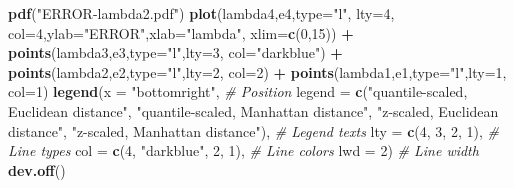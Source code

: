 \documentclass[12pt]{article}
\newenvironment{Shaded}{\begin{snugshade}}{\end{snugshade}}
\newcommand{\AttributeTok}[1]{\textcolor[rgb]{0.13,0.29,0.53}{#1}}
\newcommand{\CommentTok}[1]{\textcolor[rgb]{0.56,0.35,0.01}{\textit{#1}}}
\newcommand{\DecValTok}[1]{\textcolor[rgb]{0.00,0.00,0.81}{#1}}
\newcommand{\FunctionTok}[1]{\textcolor[rgb]{0.13,0.29,0.53}{\textbf{#1}}}
\newcommand{\NormalTok}[1]{#1}
\newcommand{\SpecialCharTok}[1]{\textcolor[rgb]{0.81,0.36,0.00}{\textbf{#1}}}
\newcommand{\StringTok}[1]{\textcolor[rgb]{0.31,0.60,0.02}{#1}}
\begin{document}
\begin{Shaded}
\begin{Highlighting}[]
\FunctionTok{pdf}\NormalTok{(}\StringTok{"ERROR{-}lambda2.pdf"}\NormalTok{)}
\FunctionTok{plot}\NormalTok{(lambda4,e4,}\AttributeTok{type=}\StringTok{"l"}\NormalTok{, }\AttributeTok{lty=}\DecValTok{4}\NormalTok{, }\AttributeTok{col=}\DecValTok{4}\NormalTok{,}\AttributeTok{ylab=}\StringTok{"ERROR"}\NormalTok{,}\AttributeTok{xlab=}\StringTok{"lambda"}\NormalTok{, }\AttributeTok{xlim=}\FunctionTok{c}\NormalTok{(}\DecValTok{0}\NormalTok{,}\DecValTok{15}\NormalTok{)) }\SpecialCharTok{+}
    \FunctionTok{points}\NormalTok{(lambda3,e3,}\AttributeTok{type=}\StringTok{"l"}\NormalTok{,}\AttributeTok{lty=}\DecValTok{3}\NormalTok{, }\AttributeTok{col=}\StringTok{"darkblue"}\NormalTok{) }\SpecialCharTok{+}
    \FunctionTok{points}\NormalTok{(lambda2,e2,}\AttributeTok{type=}\StringTok{"l"}\NormalTok{,}\AttributeTok{lty=}\DecValTok{2}\NormalTok{, }\AttributeTok{col=}\DecValTok{2}\NormalTok{) }\SpecialCharTok{+}
    \FunctionTok{points}\NormalTok{(lambda1,e1,}\AttributeTok{type=}\StringTok{"l"}\NormalTok{,}\AttributeTok{lty=}\DecValTok{1}\NormalTok{, }\AttributeTok{col=}\DecValTok{1}\NormalTok{)}
\FunctionTok{legend}\NormalTok{(}\AttributeTok{x =} \StringTok{"bottomright"}\NormalTok{,          }\CommentTok{\# Position}
       \AttributeTok{legend =} \FunctionTok{c}\NormalTok{(}\StringTok{"quantile{-}scaled, Euclidean distance"}\NormalTok{, }\StringTok{"quantile{-}scaled, Manhattan distance"}\NormalTok{, }\StringTok{"z{-}scaled, Euclidean distance"}\NormalTok{, }\StringTok{"z{-}scaled, Manhattan distance"}\NormalTok{),  }\CommentTok{\# Legend texts}
       \AttributeTok{lty =} \FunctionTok{c}\NormalTok{(}\DecValTok{4}\NormalTok{, }\DecValTok{3}\NormalTok{, }\DecValTok{2}\NormalTok{, }\DecValTok{1}\NormalTok{),           }\CommentTok{\# Line types}
       \AttributeTok{col =} \FunctionTok{c}\NormalTok{(}\DecValTok{4}\NormalTok{, }\StringTok{"darkblue"}\NormalTok{, }\DecValTok{2}\NormalTok{, }\DecValTok{1}\NormalTok{),           }\CommentTok{\# Line colors}
       \AttributeTok{lwd =} \DecValTok{2}\NormalTok{)                 }\CommentTok{\# Line width}
\FunctionTok{dev.off}\NormalTok{()}
\end{Highlighting}
\end{Shaded}
\end{document}
